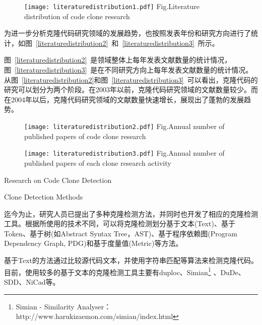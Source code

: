 \begin{figure}[h]
\centering
\texttt{[image: literaturedistribution1.pdf]}
{Fig.$\!$}{Literature distribution of code clone research}
\vspace{-1em}
\end{figure}

为进一步分析克隆代码研究领域的发展趋势，也按照发表年份和研究方向进行了统计，如图~\ref{literaturedistribution2}~和~\ref{literaturedistribution3}~所示。

图~\ref{literaturedistribution2}~是领域整体上每年发表文献数量的统计情况，图~\ref{literaturedistribution3}~是在不同研究方向上每年发表文献数量的统计情况。从图~\ref{literaturedistribution2}和图~\ref{literaturedistribution3}~可以看出，克隆代码的研究可以划分为两个阶段。在2003年以前，克隆代码研究领域的文献数量较少。而在2004年以后，克隆代码研究领域的文献数量快速增长，展现出了蓬勃的发展趋势。

\begin{figure}[h]
\centering
\texttt{[image: literaturedistribution2.pdf]}
{Fig.$\!$}{Annual number of published papers of code clone research}
\vspace{-1em}
\end{figure}
\begin{figure}[h]
\centering
\texttt{[image: literaturedistribution3.pdf]}
{Fig.$\!$}{Annual number of published papers of each clone research activity}
\vspace{-1em}
\end{figure}

{Research on Code Clone Detection }
\label{ref-detection}

{Clone Detection Methods}

迄今为止，研究人员已提出了多种克隆检测方法，并同时也开发了相应的克隆检测工具。根据所使用的技术不同，可以将克隆检测划分基于文本(Text)、基于Token、基于树(如Abstract Syntax Tree，AST)、基于程序依赖图(Program Dependency Graph, PDG)和基于度量值(Metric)等方法。

基于Text的方法通过比较源代码文本，并使用字符串匹配等算法来检测克隆代码。目前，使用较多的基于文本的克隆检测工具主要有duploc\cite{ducasse1999language}、Simian\footnote{Simian - Similarity Analyser：http://www.harukizaemon.com/simian/index.html}%
、DuDe\cite{wettel2005archeology}、SDD\cite{lee2005sdd}、NiCad\cite{roy2008nicad}等。

